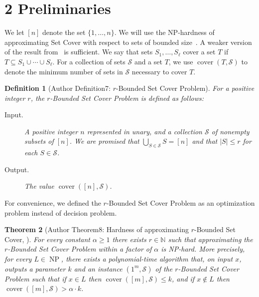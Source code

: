 \documentclass[10pt,a4paper]{article}
\newtheorem{nttheorem}{Theorem}
\newtheorem{ntdefinition}[nttheorem]{Definition}
\begin{document}
\section*{2 Preliminaries}
We let $[n]$ denote the set $\{1,\ldots,n\}$. We will use the NP-hardness of approximating Set Cover with respect to sets of bounded size~\cite{ref76}. A weaker version of the result from~\cite{ref76} is sufficient.
We say that sets $S_1,\ldots,S_\ell$ cover a set $T$ if $T\subseteq S_1\cup\cdots\cup S_\ell$. For a collection of sets $\mathcal S$ and a set $T$, we use $\operatorname{cover}(T,\mathcal S)$ to denote the minimum number of sets in $\mathcal S$ necessary to cover $T$.
\setcounter{nttheorem}{6}
\begin{ntdefinition}[Author Definition7: $r$-Bounded Set Cover Problem]
For a positive integer $r$, the $r$-Bounded Set Cover Problem is defined as follows:
\begin{description}
\item[Input.] A positive integer $n$ represented in unary, and a collection $\mathcal S$ of nonempty subsets of $[n]$. We are promised that $\bigcup_{S\in\mathcal S}S=[n]$ and that $|S|\leq r$ for each $S\in\mathcal S$.
\item[Output.] The value $\operatorname{cover}([n],\mathcal S)$.
\end{description}
\end{ntdefinition}
For convenience, we defined the $r$-Bounded Set Cover Problem as an optimization problem instead of decision problem.
\begin{nttheorem}[Author Theorem8: Hardness of approximating $r$-Bounded Set Cover, {\cite{ref76}}]
For every constant $\alpha\geq1$ there exists $r\in\mathbb N$ such that approximating the $r$-Bounded Set Cover Problem within a factor of $\alpha$ is NP-hard. More precisely, for every $L\in\operatorname{NP}$, there exists a polynomial-time algorithm that, on input $x$, outputs a parameter $k$ and an instance $(1^m,\mathcal S)$ of the $r$-Bounded Set Cover Problem such that if $x\in L$ then $\operatorname{cover}([m],\mathcal S)\leq k$, and if $x\notin L$ then $\operatorname{cover}([m],\mathcal S)>\alpha\cdot k$.
\end{nttheorem}
\end{document}
